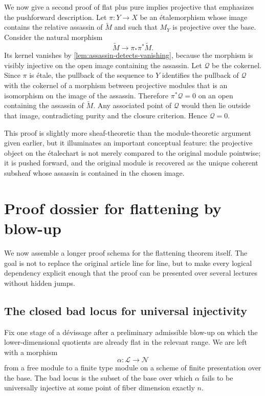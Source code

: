 \documentclass[11pt,oneside]{article}
\newcommand{\Lcal}{\mathcal L}
\newcommand{\N}{\mathcal N}
\newcommand{\Q}{\mathcal Q}
\newcommand{\etale}{\'etale}
\begin{document}
We now give a second proof of flat plus pure implies projective that emphasizes the pushforward description.  Let $\pi\colon Y\to X$ be an \etale morphism whose image contains the relative assassin of $\widetilde M$ and such that $M_Y$ is projective over the base.  Consider the natural morphism
\[
\widetilde M\longrightarrow \pi_*\pi^*\widetilde M.
\]
Its kernel vanishes by \cref{lem:assassin-detects-vanishing}, because the morphism is visibly injective on the open image containing the assassin.  Let $\Q$ be the cokernel.  Since $\pi$ is \etale, the pullback of the sequence to $Y$ identifies the pullback of $\Q$ with the cokernel of a morphism between projective modules that is an isomorphism on the image of the assassin.  Therefore $\pi^*\Q=0$ on an open containing the assassin of $\widetilde M$.  Any associated point of $\Q$ would then lie outside that image, contradicting purity and the closure criterion.  Hence $\Q=0$.

This proof is slightly more sheaf-theoretic than the module-theoretic argument given earlier, but it illuminates an important conceptual feature: the projective object on the \etale chart is not merely compared to the original module pointwise; it is pushed forward, and the original module is recovered as the unique coherent subsheaf whose assassin is contained in the chosen image.

\section{Proof dossier for flattening by blow-up}

We now assemble a longer proof schema for the flattening theorem itself.  The goal is not to replace the original article line for line, but to make every logical dependency explicit enough that the proof can be presented over several lectures without hidden jumps.

\subsection{The closed bad locus for universal injectivity}

Fix one stage of a d\'evissage after a preliminary admissible blow-up on which the lower-dimensional quotients are already flat in the relevant range.  We are left with a morphism
\[
\alpha\colon \Lcal\to \N
\]
from a free module to a finite type module on a scheme of finite presentation over the base.  The bad locus is the subset of the base over which $\alpha$ fails to be universally injective at some point of fiber dimension exactly $n$.
\end{document}
